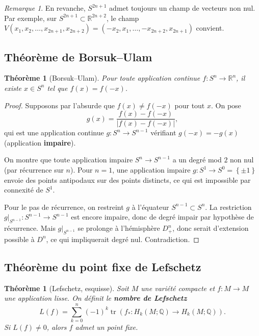 \documentclass[12pt,a4paper,openany]{book}
\theoremstyle{definition}
\theoremstyle{plain}
\newtheorem{theoreme}[definition]{Théorème}
\theoremstyle{remark}
\newtheorem{remarque}[definition]{Remarque}
\newcommand{\Q}{\mathbb{Q}}
\newcommand{\R}{\mathbb{R}}
\newcommand{\abs}[1]{\left|#1\right|}
\newcommand{\set}[1]{\left\{#1\right\}}
\begin{document}
\begin{remarque}
En revanche, $S^{2n+1}$ admet toujours un champ de vecteurs non nul.
Par exemple, sur $S^{2n+1} \subset \R^{2n+2}$, le champ
$V(x_1, x_2, \ldots, x_{2n+1}, x_{2n+2}) = (-x_2, x_1, \ldots, -x_{2n+2}, x_{2n+1})$
convient.
\end{remarque}

\subsection{Théorème de Borsuk--Ulam}

\begin{theoreme}[Borsuk--Ulam]\label{thm:borsuk-ulam}
Pour toute application continue $f : S^n \to \R^n$, il existe $x \in S^n$ tel
que $f(x) = f(-x)$.
\end{theoreme}

\begin{proof}
Supposons par l'absurde que $f(x) \neq f(-x)$ pour tout $x$. On pose
\[
  g(x) = \frac{f(x) - f(-x)}{\abs{f(x) - f(-x)}},
\]
qui est une application continue $g : S^n \to S^{n-1}$ vérifiant $g(-x) = -g(x)$
(application \textbf{impaire}).

On montre que toute application impaire $S^n \to S^{n-1}$ a un degré mod $2$
non nul (par récurrence sur $n$). Pour $n = 1$, une application impaire
$g : S^1 \to S^0 = \set{\pm 1}$ envoie des points antipodaux sur des points
distincts, ce qui est impossible par connexité de $S^1$.

Pour le pas de récurrence, on restreint $g$ à l'équateur
$S^{n-1} \subset S^n$. La restriction $g|_{S^{n-1}} : S^{n-1} \to S^{n-1}$ est
encore impaire, donc de degré impair par hypothèse de récurrence. Mais
$g|_{S^{n-1}}$ se prolonge à l'hémisphère $D^n_+$, donc serait d'extension
possible à $D^n$, ce qui impliquerait degré nul. Contradiction.
\end{proof}

\subsection{Théorème du point fixe de Lefschetz}

\begin{theoreme}[Lefschetz, esquisse]\label{thm:lefschetz}
Soit $M$ une variété compacte et $f : M \to M$ une application lisse. On
définit le \textbf{nombre de Lefschetz}
\[
  L(f) = \sum_{k=0}^n (-1)^k \operatorname{tr}(f_* : H_k(M;\Q) \to H_k(M;\Q)).
\]
Si $L(f) \neq 0$, alors $f$ admet un point fixe.
\end{theoreme}
\end{document}
